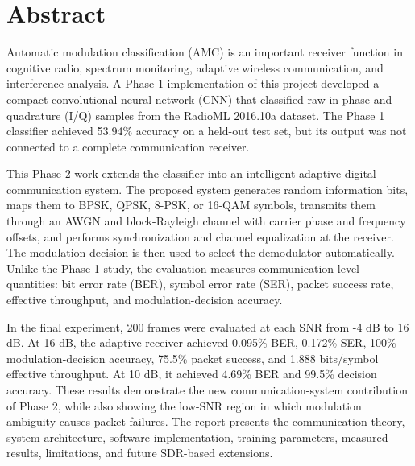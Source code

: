 \chapter*{Abstract}

Automatic modulation classification (AMC) is an important receiver function in
cognitive radio, spectrum monitoring, adaptive wireless communication, and
interference analysis. A Phase 1 implementation of this project developed a
compact convolutional neural network (CNN) that classified raw in-phase and
quadrature (I/Q) samples from the RadioML 2016.10a dataset. The Phase 1
classifier achieved 53.94\% accuracy on a held-out test set, but its output
was not connected to a complete communication receiver.

This Phase 2 work extends the classifier into an intelligent adaptive digital
communication system. The proposed system generates random information bits,
maps them to BPSK, QPSK, 8-PSK, or 16-QAM symbols, transmits them through an
AWGN and block-Rayleigh channel with carrier phase and frequency offsets, and
performs synchronization and channel equalization at the receiver. The
modulation decision is then used to select the demodulator automatically.
Unlike the Phase 1 study, the evaluation measures communication-level
quantities: bit error rate (BER), symbol error rate (SER), packet success
rate, effective throughput, and modulation-decision accuracy.

In the final experiment, 200 frames were evaluated at each SNR from -4 dB to
16 dB. At 16 dB, the adaptive receiver achieved 0.095\% BER, 0.172\% SER,
100\% modulation-decision accuracy, 75.5\% packet success, and 1.888
bits/symbol effective throughput. At 10 dB, it achieved 4.69\% BER and 99.5\%
decision accuracy. These results demonstrate the new communication-system
contribution of Phase 2, while also showing the low-SNR region in which
modulation ambiguity causes packet failures. The report presents the
communication theory, system architecture, software implementation, training
parameters, measured results, limitations, and future SDR-based extensions.
